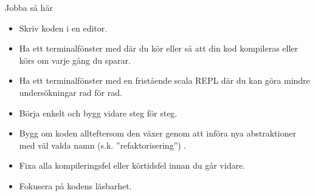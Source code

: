 \begin{SlideExtra}{Jobba så här}
\begin{itemize}
  \item Skriv koden i en editor.
  \item Ha ett terminalfönster med  där du kör  eller  så att din kod kompileras eller körs om varje gång du sparar.
  \item Ha ett terminalfönster med en fristående scala REPL där du kan göra mindre undersökningar rad för rad.
  \item Börja enkelt och bygg vidare steg för steg.
  \item Bygg om koden allteftersom den växer genom att införa nya abstraktioner med väl valda namn (s.k. ''refaktorisering'') .
  \item Fixa alla kompileringsfel eller körtidsfel innan du går vidare.
  \item Fokusera på kodens läsbarhet.
\end{itemize}

\end{SlideExtra}

\fi

